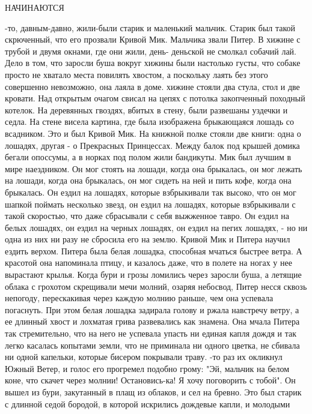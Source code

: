  НАЧИНАЮТСЯ
\par{}-то, давным-давно, жили-были старик и маленький мальчик. 
Старик был такой скрюченный, что его прозвали Кривой Мик. Мальчика 
звали Питер. В хижине с трубой и двумя окнами, где они жили, день-
деньской не смолкал собачий лай. Дело в том, что заросли буша вокруг 
хижины были настолько густы, что собаке просто не хватало места 
повилять хвостом, а поскольку лаять без этого совершенно невозможно, 
она лаяла в доме.
 хижине стояли два стула, стол и две кровати. Над открытым очагом 
свисал на цепях с потолка закопченный походный котелок. На деревянных 
гвоздях, вбитых в стену, были развешаны уздечки и седла. На стене 
висела картина, где была изображена брыкающаяся лошадь со всадником. 
Это и был Кривой Мик. На книжной полке стояли две книги: одна о 
лошадях, другая - о Прекрасных Принцессах. Между балок под крышей 
домика бегали опоссумы, а в норках под полом жили бандикуты.
 Мик был лучшим в мире наездником. Он мог стоять на лошади, 
когда она брыкалась, он мог лежать на лошади, когда она брыкалась, он 
мог сидеть на ней и пить кофе, когда она брыкалась. Он ездил на 
лошадях, которые взбрыкивали так высоко, что он мог шапкой поймать 
несколько звезд, он ездил на лошадях, которые взбрыкивали с такой 
скоростью, что даже сбрасывали с себя выжженное тавро. Он ездил на 
белых лошадях, он ездил на черных лошадях, он ездил на пегих лошадях, 
- но ни одна из них ни разу не сбросила его на землю. Кривой Мик и 
Питера научил ездить верхом.
 Питера была белая лошадка, способная мчаться быстрее ветра. А 
красотой она напоминала птицу, и казалось даже, что в полете на ногах 
у нее вырастают крылья. Когда бури и грозы ломились через заросли 
буша, а летящие облака с грохотом скрещивали мечи молний, озаряя 
небосвод, Питер несся сквозь непогоду, перескакивая через каждую 
молнию раньше, чем она успевала погаснуть. При этом белая лошадка 
задирала голову и ржала навстречу ветру, а ее длинный хвост и лохматая 
грива развевались как знамена. Она мчала Питера так стремительно, что 
на него не успевала упасть ни единая капля дождя и так легко касалась 
копытами земли, что не приминала ни одного цветка, не сбивала ни одной 
капельки, которые бисером покрывали траву.
-то раз их окликнул Южный Ветер, и голос его прогремел подобно 
грому: "Эй, мальчик на белом коне, что скачет через молнии! 
Остановись-ка! Я хочу поговорить с тобой". Он вышел из бури, 
закутанный в плащ из облаков, и сел на бревно. Это был старик с 
длинной седой бородой, в которой искрились дождевые капли, и молодыми 
